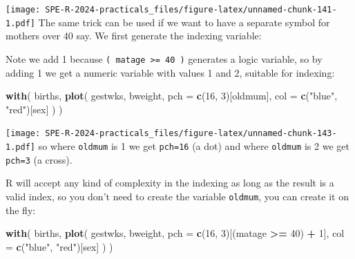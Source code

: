 \documentclass[
]{book}
\newenvironment{Shaded}{\begin{snugshade}}{\end{snugshade}}
\newcommand{\AttributeTok}[1]{\textcolor[rgb]{0.13,0.29,0.53}{#1}}
\newcommand{\DecValTok}[1]{\textcolor[rgb]{0.00,0.00,0.81}{#1}}
\newcommand{\FunctionTok}[1]{\textcolor[rgb]{0.13,0.29,0.53}{\textbf{#1}}}
\newcommand{\NormalTok}[1]{#1}
\newcommand{\OtherTok}[1]{\textcolor[rgb]{0.56,0.35,0.01}{#1}}
\newcommand{\SpecialCharTok}[1]{\textcolor[rgb]{0.81,0.36,0.00}{\textbf{#1}}}
\newcommand{\StringTok}[1]{\textcolor[rgb]{0.31,0.60,0.02}{#1}}
\begin{document}
\texttt{[image: SPE-R-2024-practicals\_files/figure-latex/unnamed-chunk-141-1.pdf]}
The same trick can be used if we want to have a separate symbol for
mothers over 40 say. We first generate the indexing variable:

\begin{Shaded}
\end{Shaded}

Note we add 1 because \texttt{(\ matage\ \textgreater{}=\ 40\ )} generates a logic
variable, so by adding 1 we get a numeric variable with values 1 and
2, suitable for indexing:

\begin{Shaded}
\begin{Highlighting}[]
\FunctionTok{with}\NormalTok{(}
\NormalTok{  births, }
  \FunctionTok{plot}\NormalTok{(}
\NormalTok{    gestwks, }
\NormalTok{    bweight, }
    \AttributeTok{pch =} \FunctionTok{c}\NormalTok{(}\DecValTok{16}\NormalTok{, }\DecValTok{3}\NormalTok{)[oldmum], }
    \AttributeTok{col =} \FunctionTok{c}\NormalTok{(}\StringTok{"blue"}\NormalTok{, }\StringTok{"red"}\NormalTok{)[sex]}
\NormalTok{  )}
\NormalTok{)}
\end{Highlighting}
\end{Shaded}

\texttt{[image: SPE-R-2024-practicals\_files/figure-latex/unnamed-chunk-143-1.pdf]}
so where \texttt{oldmum} is 1 we get \texttt{pch=16} (a dot) and where
\texttt{oldmum} is 2 we get \texttt{pch=3} (a cross).

R will accept any kind of complexity in the indexing as
long as the result is a valid index, so you don't need to create the
variable \texttt{oldmum}, you can create it on the fly:

\begin{Shaded}
\begin{Highlighting}[]
\FunctionTok{with}\NormalTok{(}
\NormalTok{  births, }
  \FunctionTok{plot}\NormalTok{(}
\NormalTok{    gestwks, }
\NormalTok{    bweight, }
    \AttributeTok{pch =} \FunctionTok{c}\NormalTok{(}\DecValTok{16}\NormalTok{, }\DecValTok{3}\NormalTok{)[(matage }\SpecialCharTok{\textgreater{}=} \DecValTok{40}\NormalTok{) }\SpecialCharTok{+} \DecValTok{1}\NormalTok{], }
    \AttributeTok{col =} \FunctionTok{c}\NormalTok{(}\StringTok{"blue"}\NormalTok{, }\StringTok{"red"}\NormalTok{)[sex]}
\NormalTok{  )}
\NormalTok{)}
\end{Highlighting}
\end{Shaded}
\end{document}
